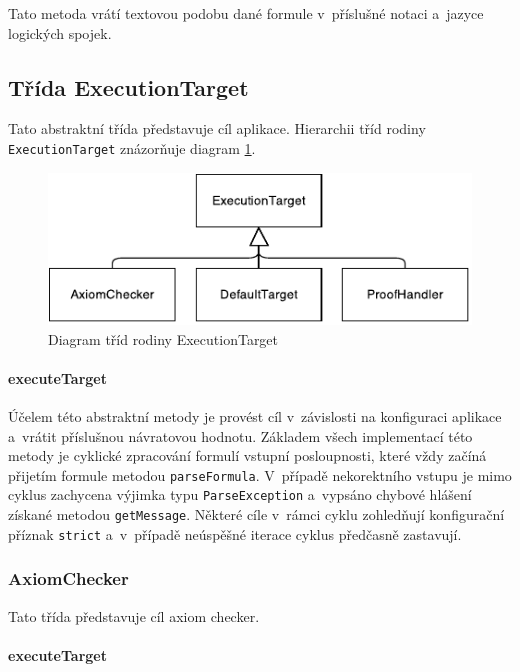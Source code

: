 \documentclass[thesis=B,czech,hidelinks]{thesis}[2012/06/26]
\begin{document}
Tato metoda vrátí textovou podobu dané formule v~příslušné notaci a~jazyce logických spojek.

\subsection{Třída ExecutionTarget}

Tato abstraktní třída představuje cíl aplikace. Hierarchii tříd rodiny \texttt{ExecutionTarget} znázorňuje diagram \ref{fig:execution_target}.

\begin{figure}
\centering
\caption{Diagram tříd rodiny ExecutionTarget}
\label{fig:execution_target}
\includegraphics{diagrams/execution_target}
\end{figure}

\paragraph{executeTarget}

Účelem této abstraktní metody je provést cíl v~závislosti na konfiguraci aplikace a~vrátit příslušnou návratovou hodnotu. Základem všech implementací této metody je cyklické zpracování formulí vstupní posloupnosti, které vždy začíná přijetím formule metodou \texttt{parseFormula}. V~případě nekorektního vstupu je mimo cyklus zachycena výjimka typu \texttt{ParseException} a~vypsáno chybové hlášení získané metodou \texttt{getMessage}. Některé cíle v~rámci cyklu zohledňují konfigurační příznak \texttt{strict} a~v~případě neúspěšné iterace cyklus předčasně zastavují.

\subsubsection{AxiomChecker}

Tato třída představuje cíl axiom checker.

\paragraph{executeTarget}
\end{document}
